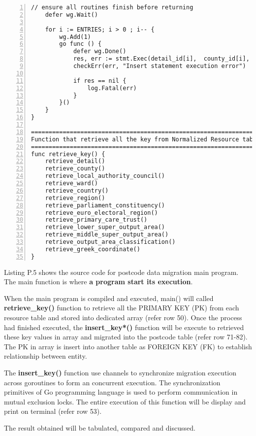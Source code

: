 \begin{lstlisting}[breaklines, frame=single, numbers=left, caption={Postcode Data Migration main program.}, label=commandline-02]
	// ensure all routines finish before returning
	defer wg.Wait()
	
	for i := ENTRIES; i > 0 ; i-- { 
		wg.Add(1)
		go func () {
			defer wg.Done()
			res, err := stmt.Exec(detail_id[i],  county_id[i], lac_id[i], ward_id[i], country_id[i], region_id[i], par_cons_id[i], eer_id[i], pct_id[i], lsoa_id[i], msoa_id[i], oac_id[i], greek_coordinate_id[i])
			checkErr(err, "Insert statement execution error") 

			if res == nil { 
				log.Fatal(err)
			}
		}()
	} 
}

=======================================================================================
Function that retrieve all the key from Normalized Resource table and stored into array
======================================================================================= 
func retrieve_key() { 
	retrieve_detail()
	retrieve_county()
	retrieve_local_authority_council()
	retrieve_ward() 
	retrieve_country()
	retrieve_region() 
	retrieve_parliament_constituency()
	retrieve_euro_electoral_region()
	retrieve_primary_care_trust()
	retrieve_lower_super_output_area()
	retrieve_middle_super_output_area()
	retrieve_output_area_classification()
	retrieve_greek_coordinate()
}

\end{lstlisting}

Listing P.5 shows the source code for postcode data migration main program. The main function is where \textbf{a program start its execution}. 

When the main program is compiled and executed, main() will called \textbf{retrieve\_key()} function to retrieve all the PRIMARY KEY (PK) from each resource table and stored into dedicated array (refer row 50). Once the process had finished executed, the \textbf{insert\_key*()} function will be execute to retrieved these key values in array and migrated into the postcode table (refer row 71-82). The PK in array is insert into another table as FOREIGN KEY (FK) to establish relationship between entity. 

The \textbf{insert\_key()} function use channels to synchronize migration execution across goroutines to form an concurrent execution. The synchronization primitives of Go programming language is used to perform communication in mutual exclusion locks. The entire execution of this function will be display and print on terminal (refer row 53). 

The result obtained will be tabulated, compared and discussed.

